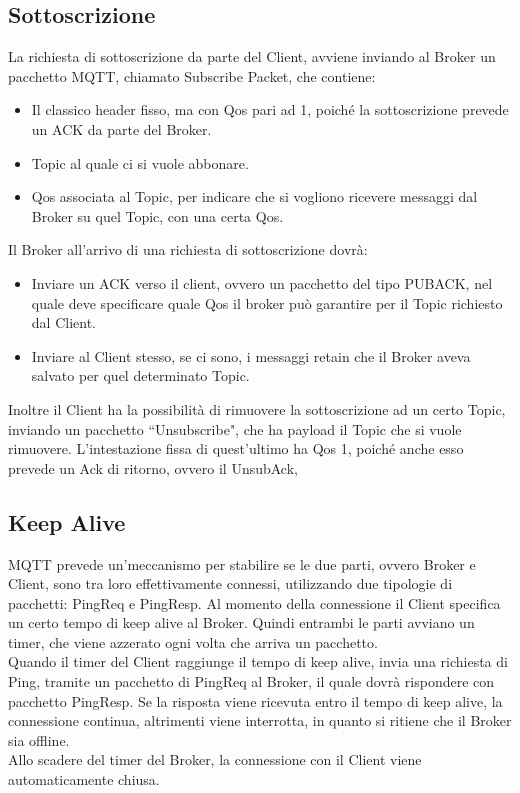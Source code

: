 \documentclass{article}
\begin{document}
\subsection{Sottoscrizione}
La richiesta di sottoscrizione da parte del Client, avviene inviando al Broker un pacchetto MQTT, chiamato Subscribe Packet, che contiene:
\begin{itemize}
	\item Il classico header fisso, ma con Qos pari ad 1, poiché la sottoscrizione prevede un ACK da parte del Broker.
	\item Topic al quale ci si vuole abbonare.
	\item Qos associata al Topic, per indicare che si vogliono ricevere messaggi dal Broker su quel Topic, con una certa Qos.
\end{itemize}
Il Broker all'arrivo di una richiesta di sottoscrizione dovrà:
\begin{itemize}
	\item Inviare un ACK verso il client, ovvero un pacchetto del tipo PUBACK, nel quale deve specificare quale Qos il broker può garantire per il Topic richiesto dal Client.
	\item Inviare al Client stesso, se ci sono, i messaggi retain che il Broker aveva salvato per quel determinato Topic.
\end{itemize}
Inoltre il Client ha la possibilità di rimuovere la sottoscrizione ad un certo Topic, inviando un pacchetto ``Unsubscribe", che ha payload il Topic che si vuole rimuovere. L'intestazione fissa di quest'ultimo ha Qos 1, poiché anche esso prevede un Ack di ritorno, ovvero il UnsubAck,

\subsection{Keep Alive}
MQTT prevede un'meccanismo per stabilire se le due parti, ovvero Broker e Client, sono tra loro effettivamente connessi, utilizzando due tipologie di pacchetti: PingReq e PingResp. Al momento della connessione il Client specifica un certo tempo di keep alive al Broker. Quindi entrambi le parti avviano un timer, che viene azzerato ogni volta che arriva un pacchetto.\\
Quando il timer del Client raggiunge il tempo di keep alive, invia una richiesta di Ping, tramite un pacchetto di PingReq al Broker, il quale dovrà rispondere con pacchetto PingResp. Se la risposta viene ricevuta entro il tempo di keep alive, la connessione continua, altrimenti viene interrotta, in quanto si ritiene che il Broker sia offline.\\
Allo scadere del timer del Broker, la connessione con il Client viene automaticamente chiusa.\\
\end{document}
